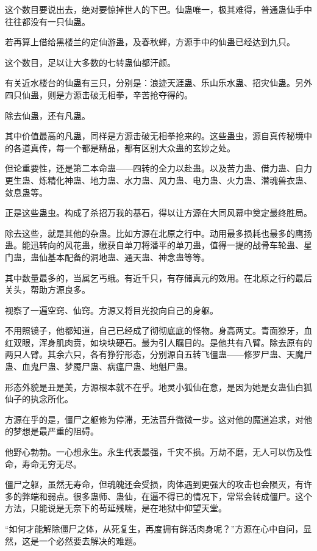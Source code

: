 \begin{this_body}
这个数目要说出去，绝对要惊掉世人的下巴。仙蛊唯一，极其难得，普通蛊仙手中往往都没有一只仙蛊。

若再算上借给黑楼兰的定仙游蛊，及春秋蝉，方源手中的仙蛊已经达到九只。

这个数目，足以让大多数的七转蛊仙都汗颜。

有关近水楼台的仙蛊有三只，分别是：浪迹天涯蛊、乐山乐水蛊、招灾仙蛊。另外四只仙蛊，则是方源击破无相拳，辛苦抢夺得的。

除去仙蛊，还有凡蛊。

其中价值最高的凡蛊，同样是方源击破无相拳抢来的。这些蛊虫，源自真传秘境中的各道真传，每一个都是精品，都有区别大众蛊的玄妙之处。

但论重要性，还是第二本命蛊——四转的全力以赴蛊。以及苦力蛊、借力蛊、自力更生蛊、炼精化神蛊、地力蛊、水力蛊、风力蛊、电力蛊、火力蛊、潜魂兽衣蛊、敛息蛊等。

正是这些蛊虫。构成了杀招万我的基石，得以让方源在大同风幕中奠定最终胜局。

除去这些，就是其他的杂蛊。比如方源在北原之行中。动用最多损耗也最多的鹰扬蛊。能迅转向的风花蛊，缴获自单刀将潘平的单刀蛊，值得一提的战骨车轮蛊、星门蛊，蛊仙基本配备的洞地蛊、通天蛊、神念蛊等等。

其中数量最多的，当属乞丐蛾。有近千只，有存储真元的效用。在北原之行的最后关头，帮助方源良多。

视察了一遍空窍、仙窍。方源又将目光投向自己的身躯。

不用照镜子，他都知道，自己已经成了彻彻底底的怪物。身高两丈。青面獠牙，血红双眼，浑身肌肉贲，如块块硬石。最为引人瞩目的。是他共有八臂。除去原有的两只人臂。其余六只，各有狰狞形态，分别源自五转飞僵蛊——修罗尸蛊、天魔尸蛊、血鬼尸蛊、梦魇尸蛊、病瘟尸蛊、地魁尸蛊。

形态外貌是丑是美，方源根本就不在乎。地灵小狐仙在意，是因为她是女蛊仙白狐仙子的执念所化。

方源在乎的是，僵尸之躯修为停滞，无法晋升微微一步。这对他的魔道追求，对他的梦想是最严重的阻碍。

他野心勃勃。一心想永生。永生代表最强，千灾不损。万劫不磨，无人可以伤及性命，寿命无穷无尽。

僵尸之躯，虽然无寿命，但魂魄还会受损，肉体遇到更强大的攻击也会陨灭，有许多的弊端和弱点。很多蛊师、蛊仙，在逼不得已的情况下，常常会转成僵尸。这个方法，只能说是无奈下的苟延残喘，是在地狱中仰望天堂。

“如何才能解除僵尸之体，从死复生，再度拥有鲜活肉身呢？”方源在心中自问，显然，这是一个必然要去解决的难题。


\end{this_body}
